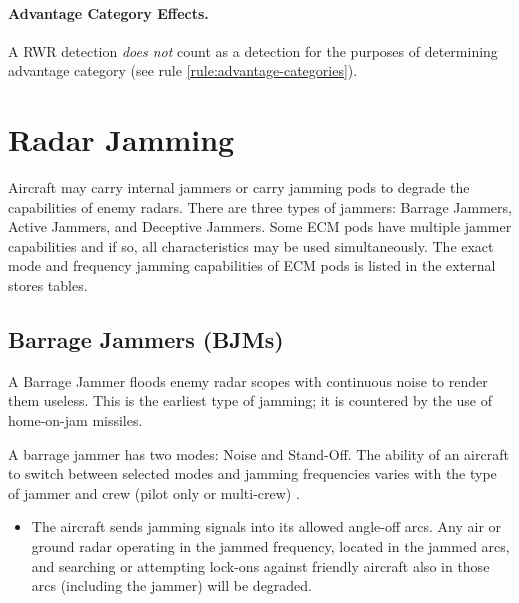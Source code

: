 \begin{advancedrules}
{\paragraph{Advantage Category Effects.} A RWR detection \emph{does not} count as a detection for the purposes of determining advantage category (see rule \ref{rule:advantage-categories}).
}

\section{Radar Jamming}
\label{rule:radar-jamming}

Aircraft may carry internal jammers or carry jamming pods to degrade the capabilities of enemy radars. There are three types of jammers: Barrage Jammers, Active Jammers, and Deceptive Jammers. Some ECM pods have multiple jammer capabilities and if so, all characteristics may be used simultaneously. The exact mode and frequency jamming capabilities of ECM pods is listed in the external stores tables. 


\subsection{Barrage Jammers (BJMs)}
\label{rule:home-on-jam-seeker}


A Barrage Jammer floods enemy radar scopes with continuous noise to render them useless. This is the earliest type of jamming; it is countered by the use of home-on-jam missiles.

A barrage jammer has two modes: Noise and Stand-Off. The ability of an aircraft to switch between selected modes and jamming frequencies varies with the type of jammer and crew (pilot only or multi-crew) . 

\begin{itemize}

    \item {} The aircraft sends jamming signals into its allowed angle-off arcs. Any air or ground radar operating in the jammed frequency, located in the jammed arcs, and searching or attempting lock-ons against friendly aircraft also in those arcs (including the jammer) will be degraded.


\end{itemize}
\end{advancedrules}
